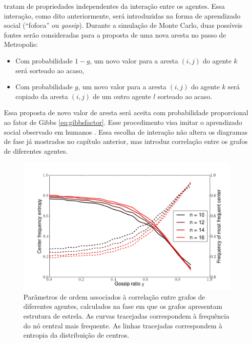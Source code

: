  tratam de propriedades independentes da interação entre os agentes. Essa interação, como dito anteriormente, será introduzidas na forma de aprendizado social (``fofoca'' ou \textit{gossip}). Durante a simulação de Monte Carlo, duas possíveis fontes serão consideradas para a proposta de uma nova aresta no passo de Metropolis:
\begin{itemize}
 \item Com probabilidade $1-g$, um novo valor para a aresta $(i,j)$ do agente $k$ será sorteado ao acaso, 
 \item Com probabilidade $g$, um novo valor para a aresta $(i,j)$ do agente $k$ será copiado da aresta $(i,j)$ de um outro agente $l$ sorteado ao acaso.
\end{itemize}
Essa proposta de novo valor de aresta será aceita com probabilidade proporcional ao fator de Gibbs \eqref{eq:gibbsfactor}. Esse procedimento visa imitar o aprendizado social observado em humanos \cite[-2em]{Dunbar2010book}. Essa escolha de interação não altera os diagramas de fase já mostrados no capítulo anterior, mas introduz correlação entre os grafos de diferentes agentes. 
\begin{figure}
	\centering
	\includegraphics[width = 1\textwidth]{figuras/gossip.png}
 	\caption[Parâmetros de ordem associados à correlação entre grafos de diferentes agentes]{ Parâmetros de ordem associados à correlação entre grafos de diferentes agentes, calculados na fase em que os grafos apresentam estrutura de estrela. As curvas tracejadas correspondem à frequência do nó central mais frequente. As linhas tracejadas correspondem à entropia da distribuição de centros.}
 	\label{fig:gossip}
\end{figure}

